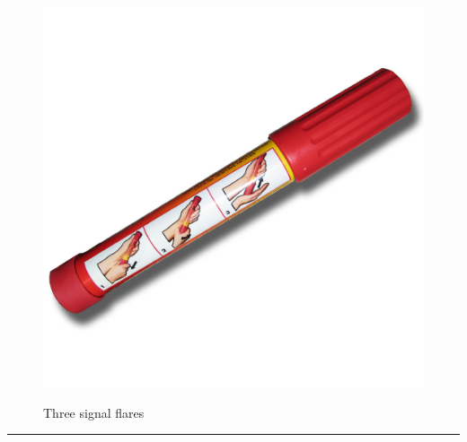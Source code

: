 \documentclass{article}
\begin{document}
    \begin{figure}[H]
        \centering
        \begin{minipage}{0.25\textwidth}
            \centering
            \includegraphics[width=\textwidth]{../SurvivalItemImages/flares}
        \end{minipage}\hfill
        \begin{minipage}{0.7\textwidth}
            \centering
            \Large Three signal flares
        \end{minipage}
    \end{figure}
    \vspace{-0.8em}
    \noindent\rule{\textwidth}{0.4pt}
            
\end{document}
